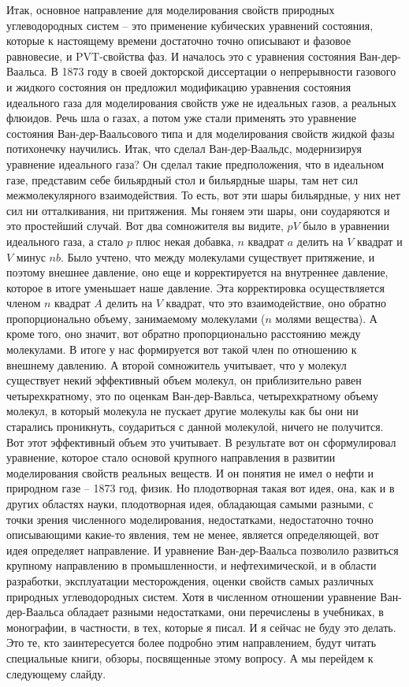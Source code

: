 \documentclass[main.tex]{subfiles}
\begin{document}
Итак, основное направление для моделирования свойств природных углеводородных систем -- это применение кубических уравнений состояния, которые к настоящему времени достаточно точно описывают и фазовое равновесие, и PVT-свойства фаз.
И началось это с уравнения состояния Ван-дер-Ваальса.
В 1873 году в своей докторской диссертации о непрерывности газового и жидкого состояния он предложил модификацию уравнения состояния идеального газа для моделирования свойств уже не идеальных газов, а реальных флюидов.
Речь шла о газах, а потом уже стали применять это уравнение состояния Ван-дер-Ваальсового типа и для моделирования свойств жидкой фазы потихонечку научились.
Итак, что сделал Ван-дер-Ваальдс, модернизируя уравнение идеального газа?
Он сделал такие предположения, что в идеальном газе, представим себе бильярдный стол и бильярдные шары, там нет сил межмолекулярного взаимодействия.
То есть, вот эти шары бильярдные, у них нет сил ни отталкивания, ни притяжения.
Мы гоняем эти шары, они соударяются и это простейший случай.
Вот два сомножителя вы видите, $pV$ было в уравнении идеального газа, а стало $p$ плюс некая добавка, $n$ квадрат $a$ делить на $V$ квадрат и $V$ минус $nb$.
Было учтено, что между молекулами существует притяжение, и поэтому внешнее давление, оно еще и корректируется на внутреннее давление, которое в итоге уменьшает наше давление.
Эта корректировка осуществляется членом $n$ квадрат $A$ делить на $V$ квадрат, что это взаимодействие, оно обратно пропорционально объему, занимаемому молекулами ($n$ молями вещества).
А кроме того, оно значит, вот обратно пропорционально расстоянию между молекулами.
В итоге у нас формируется вот такой член по отношению к внешнему давлению.
А второй сомножитель учитывает, что у молекул существует некий эффективный объем молекул, он приблизительно равен четырехкратному, это по оценкам Ван-дер-Вавльса, четырехкратному объему молекул, в который молекула не пускает другие молекулы как бы они ни старались проникнуть, соудариться с данной молекулой, ничего не получится.
Вот этот эффективный объем это учитывает.
В результате вот он сформулировал уравнение, которое стало основой крупного направления в развитии моделирования свойств реальных веществ.
И он понятия не имел о нефти и природном газе -- 1873 год, физик.
Но плодотворная такая вот идея, она, как и в других областях науки, плодотворная идея, обладающая самыми разными, с точки зрения численного моделирования, недостатками, недостаточно точно описывающими какие-то явления, тем не менее, является определяющей, вот идея определяет направление.
И уравнение Ван-дер-Ваальса позволило развиться крупному направлению в промышленности, и нефтехимической, и в области разработки, эксплуатации месторождения, оценки свойств самых различных природных углеводородных систем.
Хотя в численном отношении уравнение Ван-дер-Ваальса обладает разными недостатками, они перечислены в учебниках, в монографии, в частности, в тех, которые я писал.
И я сейчас не буду это делать.
Это те, кто заинтересуется более подробно этим направлением, будут читать специальные книги, обзоры, посвященные этому вопросу.
А мы перейдем к следующему слайду.
\end{document}

